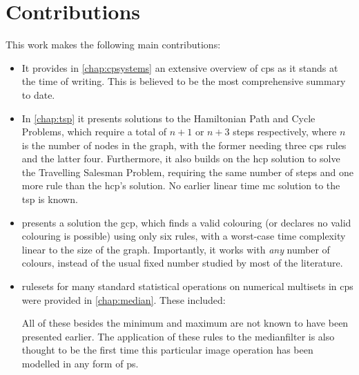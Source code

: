 
\section{Contributions}
This work makes the following main contributions:

\begin{itemize}
    \item It provides in \cref{chap:cpsystems} an extensive overview of \gls{cps} as it stands at the time of writing.  This is believed to be the most comprehensive summary to date.
    \item In \cref{chap:tsp} it presents solutions to the Hamiltonian Path and Cycle Problems, which require a total of \(n + 1\) or \(n + 3\) steps respectively, where \(n\) is the number of nodes in the graph, with the former needing three \gls{cps} rules and the latter four.  Furthermore, it also builds on the \gls{hcp} solution to solve the Travelling Salesman Problem, requiring the same number of steps and one more rule than the \gls{hcp}'s solution.  No earlier linear time \gls{mc} solution to the \gls{tsp} is known.
    \item {} presents a solution the \gls{gcp}, which finds a valid colouring (or declares no valid colouring is possible) using only six rules, with a worst-case time complexity linear to the size of the graph.  Importantly, it works with \emph{any} number of colours, instead of the usual fixed number studied by most of the literature.
    \item \Glspl{ruleset} for many standard statistical operations on numerical multisets in \gls{cps} were provided in \cref{chap:median}.  These included:
    All of these besides the minimum and maximum are not known to have been presented earlier.  The application of these rules to the \gls{medianfilter} is also thought to be the first time this particular image operation has been modelled in any form of \gls{ps}.

\end{itemize}
